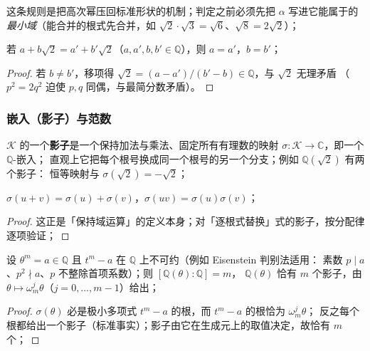 \documentclass[UTF8,a4paper,11pt]{ctexart}
\begin{document}
这条规则是把高次幂压回标准形状的机制；判定之前必须先把 $\alpha$ 写进它能属于的
\emph{最小域}（能合并的根式先合并，如 $\sqrt2\cdot\sqrt3=\sqrt6$、$\sqrt8=2\sqrt2$）；\par

\begin{proposition}[表示唯一]
\label{prop:unique}
若 $a+b\sqrt2=a'+b'\sqrt2$（$a,a',b,b'\in\mathbb{Q}$），则 $a=a'$，$b=b'$；
\end{proposition}

\begin{proof}
若 $b\ne b'$，移项得 $\sqrt2=(a-a')/(b'-b)\in\mathbb{Q}$，与 $\sqrt2$ 无理矛盾
（$p^2=2q^2$ 迫使 $p,q$ 同偶，与最简分数矛盾）。
\end{proof}

\subsubsection{嵌入（影子）与范数}

\begin{definition}[影子]
\label{def:shadow}
$\mathscr{K}$ 的一个\textbf{影子}是一个保持加法与乘法、固定所有有理数的映射
$\sigma:\mathscr{K}\to\mathbb{C}$，即一个 $\mathbb{Q}$-嵌入；
直观上它把每个根号换成同一个根号的另一个分支；例如 $\mathbb{Q}(\sqrt2)$ 有两个影子：
恒等映射与 $\sigma(\sqrt2)=-\sqrt2$；
\end{definition}

\begin{lemma}[影子尊重运算]
\label{lem:shadow-hom}
$\sigma(u+v)=\sigma(u)+\sigma(v)$，$\sigma(uv)=\sigma(u)\sigma(v)$；
\end{lemma}

\begin{proof}
这正是「保持域运算」的定义本身；对「逐根式替换」式的影子，按分配律逐项验证；
\end{proof}

\begin{lemma}[影子的个数与作用]
\label{lem:shadow-count}
设 $\theta^m=a\in\mathbb{Q}$ 且 $t^m-a$ 在 $\mathbb{Q}$ 上不可约（例如 Eisenstein 判别法适用：
素数 $p\mid a$、$p^2\nmid a$、$p$ 不整除首项系数）；则 $[\mathbb{Q}(\theta):\mathbb{Q}]=m$，
$\mathbb{Q}(\theta)$ 恰有 $m$ 个影子，由 $\theta\mapsto\omega_m^j\theta$（$j=0,\dots,m-1$）给出；
\end{lemma}

\begin{proof}
$\sigma(\theta)$ 必是极小多项式 $t^m-a$ 的根，而 $t^m-a$ 的根恰为 $\omega_m^j\theta$；
反之每个根都给出一个影子（标准事实）；影子由它在生成元上的取值决定，故恰有 $m$ 个；
\end{proof}
\end{document}
